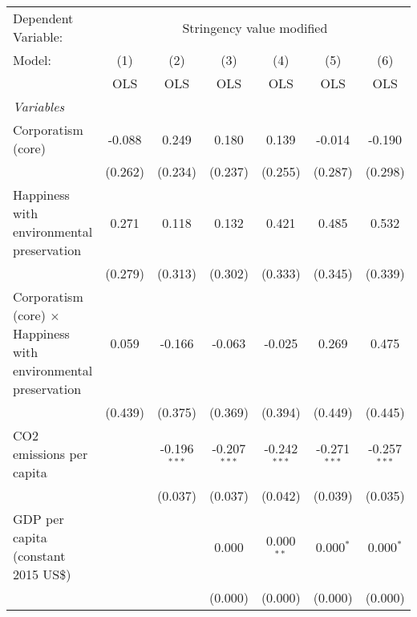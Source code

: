 
\begingroup
\centering
\begin{tabular}{lcccccc}
   \toprule
   Dependent Variable: & \multicolumn{6}{c}{Stringency value modified}\\
   Model:                                                                 & (1)     & (2)            & (3)            & (4)            & (5)            & (6)\\  
                                                                          &  OLS    & OLS            & OLS            & OLS            & OLS            & OLS\\  
   \midrule
   \emph{Variables}\\
   Corporatism (core)                                                     & -0.088  & 0.249          & 0.180          & 0.139          & -0.014         & -0.190\\   
                                                                          & (0.262) & (0.234)        & (0.237)        & (0.255)        & (0.287)        & (0.298)\\   
   Happiness with environmental preservation                              & 0.271   & 0.118          & 0.132          & 0.421          & 0.485          & 0.532\\   
                                                                          & (0.279) & (0.313)        & (0.302)        & (0.333)        & (0.345)        & (0.339)\\   
   Corporatism (core) $\times$ Happiness with environmental preservation  & 0.059   & -0.166         & -0.063         & -0.025         & 0.269          & 0.475\\   
                                                                          & (0.439) & (0.375)        & (0.369)        & (0.394)        & (0.449)        & (0.445)\\   
   CO2 emissions per capita                                               &         & -0.196$^{***}$ & -0.207$^{***}$ & -0.242$^{***}$ & -0.271$^{***}$ & -0.257$^{***}$\\   
                                                                          &         & (0.037)        & (0.037)        & (0.042)        & (0.039)        & (0.035)\\   
   GDP per capita (constant 2015 US\$)                                    &         &                & 0.000          & 0.000$^{**}$   & 0.000$^{*}$    & 0.000$^{*}$\\   
                                                                          &         &                & (0.000)        & (0.000)        & (0.000)        & (0.000)\\   

\end{tabular}
